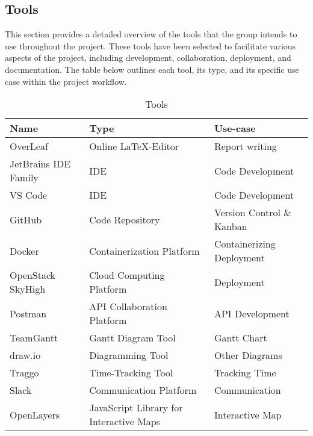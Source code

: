 \begin{comment}
    - GitOps som et sentralt konsept
    - Bruke CI/CD Pipelines i GitHubfor å automatisere så mye som mulig
    f.eks. statiske kodesjekker og inspections, unittester og integrasjonstester, også deployment for å kunne ha manuelle inspeksjoner og tester during development.
    - Linting for Go (eks. golangci-lint).
    - Plan om usertesting etter vi har MVP på plass midt i mars, jobbe utifra kravspesifikasjon og tilbakemelding fra productowner fram til det.
    
\end{comment}

\subsection{Tools}\label{sec:tools}
This section provides a detailed overview of the tools that the group intends to use throughout the project. These tools have been selected to facilitate various aspects of the project, including development, collaboration, deployment, and documentation. The table below outlines each tool, its type, and its specific use case within the project workflow.
\begin{table} [H]
    \centering
    \begin{tabular}{|l|l|l|}
    \hline
    Name & Type & Use-case \\
    \hline
    OverLeaf & Online \LaTeX-Editor & Report writing \\
    JetBrains IDE Family & IDE & Code Development \\
    VS Code & IDE & Code Development \\
    GitHub & Code Repository & Version Control \& Kanban \\
    Docker & Containerization Platform & Containerizing Deployment \\
    OpenStack SkyHigh & Cloud Computing Platform & Deployment \\
    Postman & API Collaboration Platform & API Development \\
    TeamGantt & Gantt Diagram Tool & Gantt Chart \\
    draw.io & Diagramming Tool & Other Diagrams \\
    Traggo & Time-Tracking Tool & Tracking Time \\
    Slack & Communication Platform & Communication \\
    OpenLayers & JavaScript Library for Interactive Maps & Interactive Map  \\
    \hline
    \end{tabular}
    \caption{Tools}
    \label{tab:tools}
\end{table}

